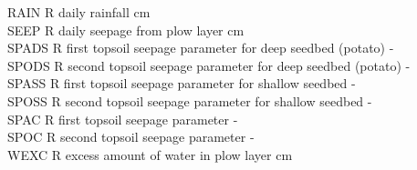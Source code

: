 \documentclass[11pt]{article}
\begin{document}
\begin{tabbing}
$$RAIN\> \> R\> daily rainfall\> \> \> \> \> \> \> cm\\
SEEP\> \> R\> daily seepage from plow layer\> \> \> \> \> \> \> cm\\
SPADS   \> \> R\> first topsoil seepage parameter for deep seedbed (potato)\> \> \> \> \> \> \> -\\
SPODS\> \> R\> second topsoil seepage parameter for deep seedbed (potato)\> \> \> \> \> \> \> -\\
SPASS\> \> R\> first topsoil seepage parameter for shallow seedbed\> \> \> \> \> \> \> -\\
SPOSS\> \> R\> second topsoil seepage parameter for shallow seedbed\> \> \> \> \> \> \> -\\
SPAC\> \> R\> first topsoil seepage parameter\> \> \> \> \> \> \> -\\
SPOC\> \> R\> second topsoil seepage parameter\> \> \> \> \> \> \> -\\
WEXC\> \> R\> excess amount of water in plow layer\> \> \> \> \> \> \> cm
\end{tabbing}
\end{document}
